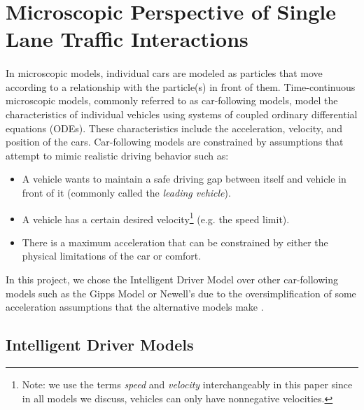 \documentclass[12pt]{article}
\begin{document}
\section{Microscopic Perspective of Single Lane Traffic Interactions}
\paragraph{} In microscopic models, individual cars are modeled as particles that move according to a relationship with the particle(s) in front of them.  Time-continuous microscopic models, commonly referred to as car-following models, model the characteristics of individual vehicles using systems of coupled ordinary differential equations (ODEs). These characteristics include the acceleration, velocity, and position of the cars.  Car-following models are constrained by assumptions \cite[Chapter~10]{treiber_kesting_2013} that attempt to mimic realistic driving behavior such as:
\begin{itemize}
\item A vehicle wants to maintain a safe driving gap between itself and vehicle in front of it (commonly called the \textit{leading vehicle}).
\item A vehicle has a certain desired velocity\footnote{Note: we use the terms \textit{speed} and \textit{velocity} interchangeably in this paper since in all models we discuss, vehicles can only have nonnegative velocities.} (e.g. the speed limit).  
\item There is a maximum acceleration that can be constrained by either the physical limitations of the car or comfort.
\end{itemize}
In this project, we chose the Intelligent Driver Model over other car-following models such as the Gipps Model or Newell's due to the oversimplification of some acceleration assumptions that the alternative models make \cite[Chapter~11]{treiber_kesting_2013}. 
\subsection{Intelligent Driver Models}
\end{document}

